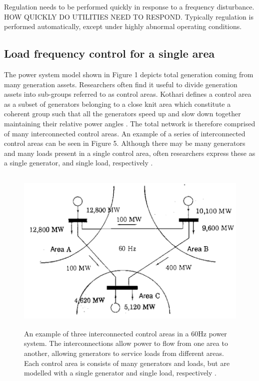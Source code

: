 \documentclass[12pt, a4paper]{article}
\begin{document}
Regulation needs to be performed quickly in response to a frequency disturbance. HOW QUICKLY DO UTILITIES NEED TO RESPOND. Typically regulation is performed automatically, except under highly abnormal operating conditions.

\subsection{Load frequency control for a single area}
The power system model shown in Figure 1 depicts total generation coming from many generation assets. Researchers often find it useful to divide generation assets into sub-groups referred to as control areas. Kothari defines a control area as a subset of generators belonging to a close knit area which constitute a coherent group such that all the generators speed up and slow down together maintaining their relative power angles \cite{Kothari2011}. The total network is therefore comprised of many interconnected control areas. An example of a series of interconnected control areas can be seen in Figure 5. Although there may be many generators and many loads present in a single control area, often researchers express these as a single generator, and single load, respectively \cite{Grainger1994}.
\begin{figure}[h]
	\centering
	\includegraphics[height=8cm]{multiple_area_system}
	\caption{An example of three interconnected control areas in a 60$\si{\hertz}$ power system. The interconnections allow power to flow from one area to another, allowing generators to service loads from different areas. Each control area is consists of many generators and loads, but are modelled with a single generator and single load, respectively \cite{Grainger1994}.}
\end{figure}
\end{document}

